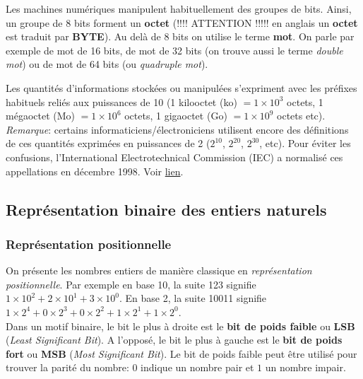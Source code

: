 \documentclass[11pt, french]{article}
\begin{document}
    Les machines numériques manipulent habituellement des groupes de bits.
Ainsi, un groupe de 8 bits forment un \textbf{octet} (!!!! ATTENTION
!!!!! en anglais un \textbf{octet} est traduit par \textbf{BYTE}). Au
delà de 8 bits on utilise le terme \textbf{mot}. On parle par exemple de
mot de 16 bits, de mot de 32 bits (on trouve aussi le terme \emph{double
mot}) ou de mot de 64 bits (ou \emph{quadruple mot}).

    Les quantités d'informations stockées ou manipulées s'expriment avec les
préfixes habituels reliés aux puissances de 10 (1 kilooctet (ko)
\(= 1\times10^3\) octets, 1 mégaoctet (Mo) \(= 1\times10^6\) octets, 1
gigaoctet (Go) \(= 1\times10^9\) octets etc).\\
\emph{Remarque}: certains informaticiens/électroniciens utilisent encore
des définitions de ces quantités exprimées en puissances de 2
(\(2^{10}\), \(2^{20}\), \(2^{30}\), etc). Pour éviter les confusions,
l'International Electrotechnical Commission (IEC) a normalisé ces
appellations en décembre 1998. Voir
\href{https://physics.nist.gov/cuu/Units/binary.html}{lien}.

    \hypertarget{repruxe9sentation-binaire-des-entiers-naturels}{%
\subsection{Représentation binaire des entiers
naturels}\label{repruxe9sentation-binaire-des-entiers-naturels}}

\hypertarget{repruxe9sentation-positionnelle}{%
\subsubsection{Représentation
positionnelle}\label{repruxe9sentation-positionnelle}}

On présente les nombres entiers de manière classique en
\emph{représentation positionnelle}. Par exemple en base 10, la suite
123 signifie \(1\times 10^2+2\times 10^1+3\times 10^0\). En base 2, la
suite 10011 signifie
\(1\times 2^4+0\times 2^3+0\times 2^2+1\times 2^1+1\times 2^0\).\\
Dans un motif binaire, le bit le plus à droite est le \textbf{bit de
poids faible} ou \textbf{LSB} (\emph{Least Significant Bit}). A
l'opposé, le bit le plus à gauche est le \textbf{bit
de poids fort} ou \textbf{MSB} (\emph{Most Significant Bit}). Le bit de
poids faible peut être utilisé pour trouver la parité du nombre: \(0\)
indique un nombre pair et \(1\) un nombre impair.
\end{document}
